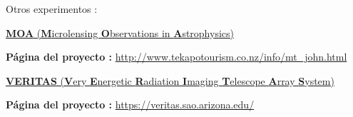 Otros experimentos : 
\begin{itemize_f}
\item \href{https://en.wikipedia.org/wiki/Microlensing_Observations_in_Astrophysics}{\textbf{MOA} (\textbf{M}icrolensing \textbf{O}bservations in \textbf{A}strophysics) }

\textbf{Página del proyecto :} \href{http://www.tekapotourism.co.nz/info/mt_john.html}{http://www.tekapotourism.co.nz/info/\-mt\_\-john\-.html}

\item \href{https://en.wikipedia.org/wiki/VERITAS}{\textbf{VERITAS} (\textbf{V}ery \textbf{E}nergetic \textbf{R}adiation \textbf{I}maging \textbf{T}elescope \textbf{A}rray \textbf{S}ystem)}

\textbf{Página del proyecto :} \href{https://veritas.sao.arizona.edu/}{https://veritas.sao.arizona.edu/}
\end{itemize_f}




